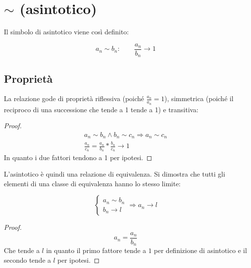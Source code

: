 %
%
%
%


\section{\texorpdfstring{$\sim$ (asintotico)}{Asintotico}}
Il simbolo di asintotico viene così definito:
\begin{defin}
	\[
		a_n\sim b_n:\qquad\frac{a_n}{b_n}\to1
	\]
\end{defin}


\subsection{Proprietà}
La relazione gode di proprietà riflessiva (poiché $\frac{a_n}{a_n}=1$), simmetrica (poiché il reciproco di una successione che tende a 1 tende a 1) e transitiva:
\begin{proof}
	\begin{gather*}
		a_n\sim b_n\land b_n\sim c_n\Rightarrow a_n\sim c_n\\
		\frac{a_n}{c_n}=\frac{a_n}{b_n}*\frac{b_n}{c_n}\to1
	\end{gather*}
	In quanto i due fattori tendono a 1 per ipotesi.
\end{proof}
L'asintotico è quindi una relazione di equivalenza. Si dimostra che tutti gli elementi di una classe di equivalenza hanno lo stesso limite:
\begin{teor}
	\[
		\begin{cases}
			a_n\sim b_n \\
			b_n\to l
		\end{cases}\Rightarrow a_n\to l
	\]
\end{teor}
\begin{proof}
	\[
		a_n=\frac{a_n}{b_n}
	\]
	Che tende a $l$ in quanto il primo fattore tende a $1$ per definizione di asintotico e il secondo tende a $l$ per ipotesi.
\end{proof}


